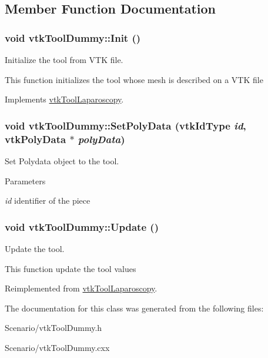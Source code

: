 \subsection{Member Function Documentation}
\hypertarget{classvtkToolDummy_aaf4c69a9c0fc3432e678ca9fffc913dc}{
\subsubsection[{Init}]{\setlength{\rightskip}{0pt plus 5cm}void vtkToolDummy::Init ()}}
\label{classvtkToolDummy_aaf4c69a9c0fc3432e678ca9fffc913dc}


Initialize the tool from VTK file. 

This function initializes the tool whose mesh is described on a VTK file 

Implements \hyperlink{classvtkToolLaparoscopy_ace75ea21a3ddb27547976ddea0ebb60e}{vtkToolLaparoscopy}.

\hypertarget{classvtkToolDummy_a3170be76c18a7507cb6014fc49123919}{
\subsubsection[{SetPolyData}]{\setlength{\rightskip}{0pt plus 5cm}void vtkToolDummy::SetPolyData (vtkIdType {\em id}, \/  vtkPolyData $\ast$ {\em polyData})}}
\label{classvtkToolDummy_a3170be76c18a7507cb6014fc49123919}
Set Polydata object to the tool. 
\begin{DoxyParams}{Parameters}
\item[{\em id}]identifier of the piece \end{DoxyParams}
\hypertarget{classvtkToolDummy_a19cda726ffda0a3955e519d7b42e4882}{
\subsubsection[{Update}]{\setlength{\rightskip}{0pt plus 5cm}void vtkToolDummy::Update ()}}
\label{classvtkToolDummy_a19cda726ffda0a3955e519d7b42e4882}


Update the tool. 

This function update the tool values 

Reimplemented from \hyperlink{classvtkToolLaparoscopy_a4445a0cfabd77b50a06929b04cb71f9e}{vtkToolLaparoscopy}.



The documentation for this class was generated from the following files:\begin{DoxyCompactItemize}
\item 
Scenario/vtkToolDummy.h\item 
Scenario/vtkToolDummy.cxx\end{DoxyCompactItemize}
